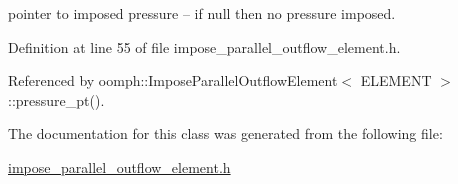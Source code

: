 pointer to imposed pressure -- if null then no pressure imposed. 



Definition at line 55 of file impose\+\_\+parallel\+\_\+outflow\+\_\+element.\+h.



Referenced by oomph\+::\+Impose\+Parallel\+Outflow\+Element$<$ E\+L\+E\+M\+E\+N\+T $>$\+::pressure\+\_\+pt().



The documentation for this class was generated from the following file\+:\begin{DoxyCompactItemize}
\item 
\hyperlink{impose__parallel__outflow__element_8h}{impose\+\_\+parallel\+\_\+outflow\+\_\+element.\+h}\end{DoxyCompactItemize}
